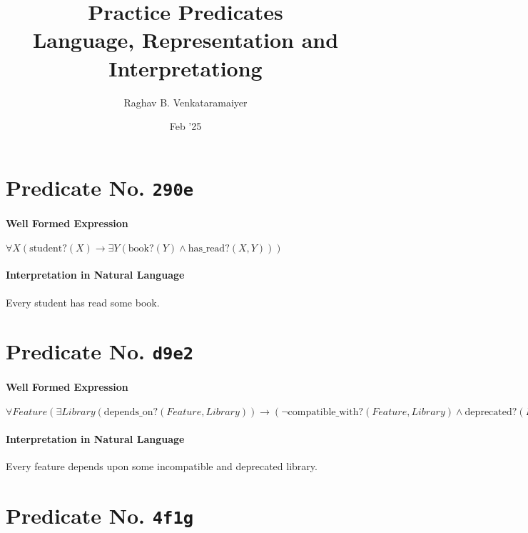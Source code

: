 \documentclass[11pt]{article}
\author{Raghav B. Venkataramaiyer}
\date{Feb '25}
\title{Practice Predicates\\\medskip
\large Language, Representation and Interpretationg}
\begin{document}
\maketitle

\section{Predicate No. \texttt{290e}}
\label{sec:orged1c636}

\paragraph*{Well Formed Expression}
\label{sec:orgdfd00d1}

\(\forall X (\text{student?}(X) \rightarrow \exists Y (\text{book?}(Y) \land \text{has\_read?}(X, Y)))\)

\paragraph*{Interpretation in Natural Language}
\label{sec:org1a972e2}

Every student has read some book.



\section{Predicate No. \texttt{d9e2}}
\label{sec:org31a50e7}

\paragraph*{Well Formed Expression}
\label{sec:orgff0fbef}

\(\forall \mathit{Feature} (\exists \mathit{Library} (\mathrm{depends\_on?}(\mathit{Feature}, \mathit{Library})) \rightarrow (\neg \mathrm{compatible\_with?}(\mathit{Feature}, \mathit{Library}) \land \mathrm{deprecated?}(\mathit{Library})))\)

\paragraph*{Interpretation in Natural Language}
\label{sec:org73843f9}

Every feature depends upon some incompatible and deprecated library.



\section{Predicate No. \texttt{4f1g}}
\label{sec:org0c237bc}
\end{document}
